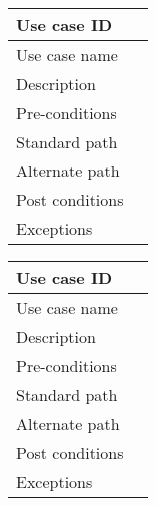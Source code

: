 \documentclass{article}
\begin{document}
\begin{tabular}{ | l || p{10cm} | }
	
	\hline
	Use case ID & \\ \hline
	Use case name &  \\ \hline
	Description &  \\ \hline
	Pre-conditions &   \\ \hline
	Standard path & \\ \hline
	Alternate path &  \\ \hline
	Post conditions &  \\ \hline
	Exceptions &  \\ \hline

\end{tabular}

\begin{tabular}{ | l || p{10cm} | }
	
	\hline
	Use case ID & \\ \hline
	Use case name &  \\ \hline
	Description &  \\ \hline
	Pre-conditions &   \\ \hline
	Standard path & \\ \hline
	Alternate path &  \\ \hline
	Post conditions &  \\ \hline
	Exceptions &  \\ \hline

\end{tabular}

\newpage
\end{document}
